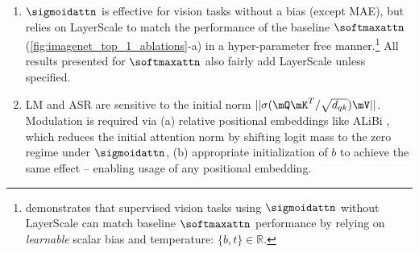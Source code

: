 \begin{enumerate}[itemsep=0pt,leftmargin=*]
    \item $\sigmoidattn$ is effective for vision tasks without a bias (except MAE), but relies on LayerScale to match the performance of the baseline $\softmaxattn$ (\cref{fig:imagenet_top_1_ablations}-a) in a hyper-parameter free manner.\footnote{ demonstrates that supervised vision tasks using $\sigmoidattn$ without LayerScale can match baseline $\softmaxattn$ performance by relying on \emph{learnable} scalar bias and temperature: $\{b, t\} \in \mathbb{R}$.} All results presented for $\softmaxattn$ also fairly add LayerScale unless specified.
    \item LM and ASR are sensitive to the initial norm $|| \sigma(\mQ \mK^T/\sqrt{d_{qk}}) \mV ||$. Modulation is required via (a) relative positional embeddings like ALiBi \citep{DBLP:conf/iclr/PressSL22}, which reduces the initial attention norm by shifting logit mass to the zero regime under $\sigmoidattn$, (b) appropriate initialization of $b$ to achieve the same effect -- enabling usage of any positional embedding.
\end{enumerate}

